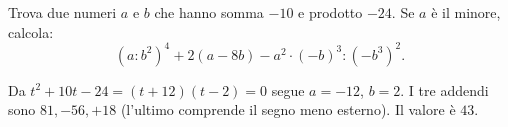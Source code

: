 
\begin{esercizio}
Trova due numeri $a$ e $b$ che hanno somma $-10$ e prodotto $-24$. Se $a$ è il minore, calcola:
    \[
    (a:b^2)^4+2(a-8b)-a^2\cdot(-b)^3:(-b^3)^2.
    \]
\end{esercizio}

\begin{soluzione}
Da $t^2+10t-24=(t+12)(t-2)=0$ segue $a=-12$, $b=2$.
I tre addendi sono $81,-56,+18$ (l'ultimo comprende il segno meno esterno).
Il valore è $43$.
\end{soluzione}
